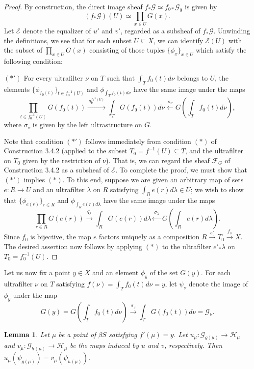 \documentclass[11pt]{article}
\theoremstyle{plain}
\newtheorem{lemma}{Lemma}
\theoremstyle{definition}
\begin{document}
\begin{proof}
By construction, the direct image sheaf $f_*\mathscr{G} \simeq f_{0*}\mathscr{G}_0$ is given by
\[
(f_*\mathscr{G})(U) \simeq \prod_{x \in U} G(x).
\]
Let $\mathscr{E}$ denote the equalizer of $u'$ and $v'$, regarded as a subsheaf of $f_*\mathscr{G}$. Unwinding the definitions, we see that for each subset $U \subseteq X$, we can identify $\mathscr{E}(U)$ with the subset of $\prod_{x \in U} G(x)$ consisting of those tuples $\{\phi_x\}_{x \in U}$ which satisfy the following condition:

\smallskip
\noindent $(\ast')$ For every ultrafilter $\nu$ on $T$ such that $\int_T f_0(t)d\nu$ belongs to $U$, the elements $\{\phi_{f_0(t)}\}_{t \in f_0^{-1}(U)}$ and $\phi_{\int_T f_0(t)d\nu}$ have the same image under the maps
\[
\prod_{t \in f_0^{-1}(U)} G(f_0(t)) \xrightarrow{\ q_\nu^{f_0^{-1}(U)}\ } \int_T G(f_0(t))d\nu \xleftarrow{\ \sigma_\nu\ } G(\int_T f_0(t)d\nu),
\]
where $\sigma_\nu$ is given by the left ultrastructure on $G$.
\smallskip

Note that condition $(\ast')$ follows immediately from condition $(\ast)$ of Construction 3.4.2 (applied to the subset $T_0 = f^{-1}(U) \subseteq T$, and the ultrafilter on $T_0$ given by the restriction of $\nu$). That is, we can regard the sheaf $\mathscr{F}_G$ of Construction 3.4.2 as a subsheaf of $\mathscr{E}$. To complete the proof, we must show that $(\ast')$ implies $(\ast)$. To this end, suppose we are given an arbitrary map of sets $e : R \to U$ and an ultrafilter $\lambda$ on $R$ satisfying $\int_R e(r)d\lambda \in U$; we wish to show that $\{\phi_{e(r)}\}_{r \in R}$ and $\phi_{\int_R e(r)d\lambda}$ have the same image under the maps
\[
\prod_{r \in R} G(e(r)) \xrightarrow{\ q_\lambda\ } \int_R G(e(r))d\lambda \xleftarrow{\ \sigma_\lambda\ } G(\int_R e(r)d\lambda).
\]
Since $f_0$ is bijective, the map $e$ factors uniquely as a composition $R \xrightarrow{\ e'\ } T_0 \xrightarrow{\ f_0\ } X$. The desired assertion now follows by applying $(\ast)$ to the ultrafilter $e'_*\lambda$ on $T_0 = f_0^{-1}(U)$.
\end{proof}

Let us now fix a point $y \in X$ and an element $\phi_y$ of the set $G(y)$. For each ultrafilter $\nu$ on $T$ satisfying $f(\nu) = \int_T f_0(t)d\nu = y$, let $\psi_\nu$ denote the image of $\phi_y$ under the map
\[
G(y) = G(\int_T f_0(t)d\nu) \xrightarrow{\ \sigma_\nu\ } \int_T G(f_0(t))d\nu = \mathscr{G}_\nu.
\]

\renewcommand{\thelemma}{3.5.4}
\begin{lemma}
Let $\mu$ be a point of $\beta S$ satisfying $f'(\mu) = y$. Let $u_\mu : \mathscr{G}_{g(\mu)} \to \mathscr{H}_\mu$ and $v_\mu : \mathscr{G}_{h(\mu)} \to \mathscr{H}_\mu$ be the maps induced by $u$ and $v$, respectively. Then $u_\mu(\psi_{g(\mu)}) = v_\mu(\psi_{h(\mu)})$.
\end{lemma}
\end{document}
